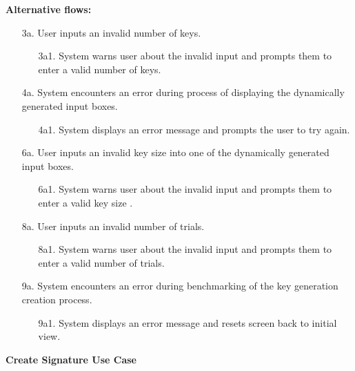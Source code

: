 \documentclass[]{final_report}
\theoremstyle{definition}
\begin{document}
\noindent\textbf{Alternative flows:}
\begin{enumerate}
    \item[3a.] User inputs an invalid number of keys.
    \begin{enumerate}
        \item[3a1.] System warns user about the invalid input and prompts them to enter a valid number of keys.
    \end{enumerate}
        \item[4a.] System encounters an error during process of displaying the dynamically generated input boxes.
    \begin{enumerate}
        \item[4a1.] System displays an error message and prompts the user to try again.
    \end{enumerate}
    \item[6a.] User inputs an invalid key size into one of the dynamically generated input boxes.
    \begin{enumerate}
        \item[6a1.] System warns user about the invalid input and prompts them to enter a valid key size .
    \end{enumerate}
     \item[8a.] User inputs an invalid number of trials.
    \begin{enumerate}
        \item[8a1.] System warns user about the invalid input and prompts them to enter a valid number of trials.
    \end{enumerate}
        \item[9a.] System encounters an error during benchmarking of the key generation creation process.
    \begin{enumerate}
        \item[9a1.] System displays an error message and resets screen back to initial view.
    \end{enumerate}  
\end{enumerate}



\textbf{Create Signature Use Case}
\end{document}

